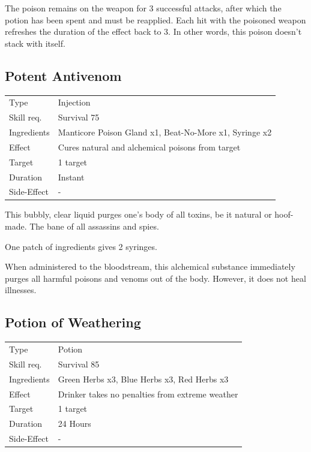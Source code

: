 \documentclass[11pt,a4paper,twocolumn]{book}
\begin{document}
The poison remains on the weapon for 3 successful attacks, after which the potion has been spent and must be reapplied. Each hit with the poisoned weapon refreshes the duration of the effect back to 3. In other words, this poison doesn't stack with itself.


\subsection*{Potent Antivenom}
{
	\begin{tabu} to 75mm{| X[l,4] | X[l,8] |}
		\hline
		Type 			& Injection													\\
        Skill req.	    & Survival 75 												\\
        Ingredients     & Manticore Poison Gland x1, Beat-No-More x1, Syringe x2	\\
        Effect     		& Cures natural and alchemical poisons from target 			\\
        Target      	& 1 target													\\
        Duration  		& Instant	 												\\
        Side-Effect     & -															\\ \hline
	\end{tabu}
		
}

\medskip

This bubbly, clear liquid purges one's body of all toxins, be it natural or hoof-made. The bane of all assassins and spies.

One patch of ingredients gives 2 syringes.

When administered to the bloodstream, this alchemical substance immediately purges all harmful poisons and venoms out of the body. However, it does not heal illnesses.


\subsection*{Potion of Weathering}
{
	\begin{tabu} to 75mm{| X[l,4] | X[l,8] |}
		\hline
		Type 			& Potion 													\\
        Skill req.	    & Survival 85 												\\
        Ingredients     & Green Herbs x3, Blue Herbs x3, Red Herbs x3				\\
        Effect     		& Drinker takes no penalties from extreme weather			\\
        Target      	& 1 target													\\
        Duration  		& 24 Hours	 												\\
        Side-Effect     & -															\\ \hline
	\end{tabu}
		
}
\end{document}
